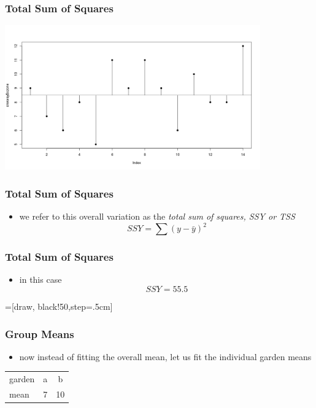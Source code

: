 \begin{frame}\frametitle{Total Sum of Squares}
\begin{center}
\includegraphics[width=11cm]{img/TSS.png}
\end{center}
\end{frame}

\begin{frame}\frametitle{Total Sum of Squares}
  \begin{itemize}
  \item we refer to this overall variation as the \emph{total sum of squares, SSY or TSS} 
$$ SSY = \sum(y-\bar{y})^2$$
  \end{itemize}
\end{frame}

\begin{frame}\frametitle{Total Sum of Squares}
  \begin{itemize}
  \item in this case $$SSY = 55.5$$
  \end{itemize}
   =[draw, black!50,step=.5cm]
\end{frame}

\begin{frame}\frametitle{Group Means}
  \begin{itemize}
  \item now instead of fitting the overall mean, let us fit the individual garden means
  \end{itemize}
\begin{table}[ht]
\centering
\begin{tabular}{lcc}
  \hline
garden & a & b \\ 
  mean &  7 & 10 \\ 
   \hline
\end{tabular}
\end{table}
\end{frame}

